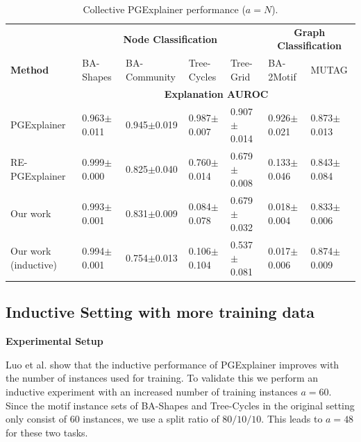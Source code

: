 \begin{table}[ht]
    \centering
    \scriptsize
    \begin{tabularx}{\textwidth}{l|XXXX|XX}   %
    \textbf{} & \multicolumn{4}{c}{\textbf{Node Classification}} & \multicolumn{2}{c}{\textbf{Graph Classification}} \\
    \textbf{Method} & BA-Shapes & BA-Community & Tree-Cycles & Tree-Grid & BA-2Motif & MUTAG \\
    \midrule
    \addlinespace
    \textbf{} & \multicolumn{6}{c}{\textbf{Explanation AUROC}} \\
    \midrule
    PGExplainer & 0.963$\pm$0.011 & 0.945$\pm$0.019 & 0.987$\pm$0.007 & 0.907$\pm$0.014 & 0.926$\pm$0.021 & 0.873$\pm$0.013 \\
    \midrule
    RE-PGExplainer & 0.999$\pm$0.000 & 0.825$\pm$0.040 & 0.760$\pm$0.014 & 0.679$\pm$0.008 & 0.133$\pm$0.046 & 0.843$\pm$0.084 \\
    \midrule
    Our work & 0.993$\pm$0.001 & 0.831$\pm$0.009 & 0.084$\pm$0.078 & 0.679$\pm$0.032 & 0.018$\pm$0.004 & 0.833$\pm$0.006 \\
    \midrule
    \midrule
    Our work (inductive) & 0.994$\pm$0.001 & 0.754$\pm$0.013 & 0.106$\pm$0.104 & 0.537$\pm$0.081 & 0.017$\pm$0.006 & 0.874$\pm$0.009 \\
    \bottomrule
    \end{tabularx}
    \caption[Collective performance of our reimplementation]{Collective PGExplainer performance ($a=N$).}
    \label{tab:pgexplainer_auc_collective}
\end{table}


\subsection{Inductive Setting with more training data}
\label{sec:exp_more_train}

\textbf{Experimental Setup}\par
Luo et al. \cite{luo2020parameterized} show that the inductive performance of PGExplainer improves with the number of instances used for training. To validate this we perform an inductive experiment with an increased number of training instances $a=60$. Since the motif instance sets of BA-Shapes and Tree-Cycles in the original setting only consist of 60 instances, we use a split ratio of $80/10/10$. This leads to $a=48$ for these two tasks. \bigskip

